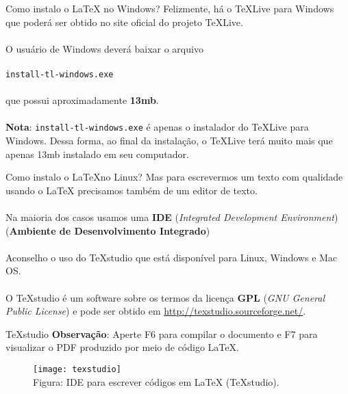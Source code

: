 \documentclass{beamer}
\begin{document}
\begin{frame}{Como instalo o \LaTeX \hspace{0.03cm} no Windows?}
	Felizmente, há o \TeX Live para Windows que poderá ser obtido no site oficial do projeto \TeX Live. \\~\\
	
	O usuário de Windows deverá baixar o arquivo\\~\\
	\hspace{3cm}\texttt{install-tl-windows.exe} \\~\\
	
	que possui aproximadamente \textbf{13mb}.\\~\\
	
	\textbf{Nota}: \texttt{install-tl-windows.exe} é apenas o instalador do \TeX Live para Windows. Dessa forma, ao final da instalação, o \TeX Live terá muito mais que apenas 13mb instalado em seu computador.
\end{frame}

\begin{frame}{Como instalo o \LaTeX no Linux?}
Mas para escrevermos um texto com qualidade usando o \LaTeX\hspace{0.03cm} precisamos também de um editor de texto.\\~\\

Na maioria dos casos usamos uma \textbf{IDE} (\textit{Integrated Development Environment}) (\textbf{Ambiente de Desenvolvimento Integrado})\\~\\

Aconselho o uso do \TeX studio que está disponível para Linux, Windows e Mac OS. \\~\\

O \TeX studio é um software sobre os termos da licença \textbf{GPL} (\textit{GNU General Public License}) e pode ser obtido em \url{http://texstudio.sourceforge.net/}. 
\end{frame}

\begin{frame}{\TeX studio}
\textbf{Observação}: Aperte F6 para compilar o documento e F7 para visualizar o PDF produzido por meio de código \LaTeX.
\begin{figure}[!htb]
\centering
\texttt{[image: texstudio]}\\
Figura: IDE para escrever códigos em \LaTeX \hspace{0.03cm} (\TeX studio).
\end{figure}	
\end{frame}
\end{document}
